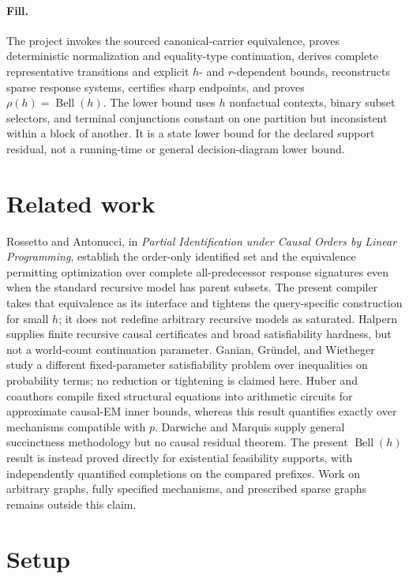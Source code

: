 \documentclass{article}
\begin{document}
\paragraph{Fill.} The project invokes the sourced canonical-carrier equivalence, proves deterministic normalization and equality-type continuation, derives complete representative transitions and explicit \(h\)- and \(r\)-dependent bounds, reconstructs sparse response systems, certifies sharp endpoints, and proves \(\rho(h)=\operatorname{Bell}(h)\). The lower bound uses \(h\) nonfactual contexts, binary subset selectors, and terminal conjunctions constant on one partition but inconsistent within a block of another. It is a state lower bound for the declared support residual, not a running-time or general decision-diagram lower bound.

\section{Related work}

Rossetto and Antonucci, in \emph{Partial Identification under Causal Orders by Linear Programming}, establish the order-only identified set and the equivalence permitting optimization over complete all-predecessor response signatures even when the standard recursive model has parent subsets. The present compiler takes that equivalence as its interface and tightens the query-specific construction for small \(h\); it does not redefine arbitrary recursive models as saturated. Halpern supplies finite recursive causal certificates and broad satisfiability hardness, but not a world-count continuation parameter. Ganian, Gr\"{u}ndel, and Wietheger study a different fixed-parameter satisfiability problem over inequalities on probability terms; no reduction or tightening is claimed here. Huber and coauthors compile fixed structural equations into arithmetic circuits for approximate causal-EM inner bounds, whereas this result quantifies exactly over mechanisms compatible with \(p\). Darwiche and Marquis supply general succinctness methodology but no causal residual theorem. The present \(\operatorname{Bell}(h)\) result is instead proved directly for existential feasibility supports, with independently quantified completions on the compared prefixes. Work on arbitrary graphs, fully specified mechanisms, and prescribed sparse graphs remains outside this claim.

\section{Setup}
\end{document}
